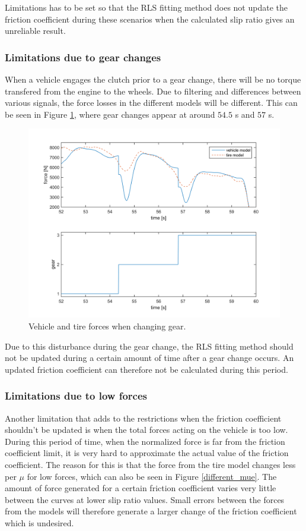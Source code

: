Limitations has to be set so that the RLS fitting method does not update the friction coefficient during these scenarios when the calculated slip ratio gives an unreliable result.

\subsubsection{Limitations due to gear changes}
\label{sec:gearchange}
When a vehicle engages the clutch prior to a gear change, there will be no torque transfered from the engine to the wheels. Due to filtering and differences between various signals, the force losses in the different models will be different. This can be seen in Figure \ref{gear_change}, where gear changes appear at around $ 54.5 $ s and $ 57 $ s.

\begin{figure}[h]
	\centering
	\includegraphics[width=1.0\textwidth]{Pictures/gear_change}
	\caption {Vehicle and tire forces when changing gear.}
	\label{gear_change}
\end{figure}

Due to this disturbance during the gear change, the RLS fitting method should not be updated during a certain amount of time after a gear change occurs. An updated friction coefficient can therefore not be calculated during this period. 

\subsubsection{Limitations due to low forces}
Another limitation that adds to the restrictions when the friction coefficient shouldn't be updated is when the total forces acting on the vehicle is too low. During this period of time, when the normalized force is far from the friction coefficient limit, it is very hard to approximate the actual value of the friction coefficient. The reason for this is that the force from the tire model changes less per $ \mu $ for low forces, which can also be seen in Figure \ref{different_mue}. The amount of force generated for a certain friction coefficient varies very little between the curves at lower slip ratio values. Small errors between the forces from the models will therefore generate a larger change of the friction coefficient which is undesired. 


